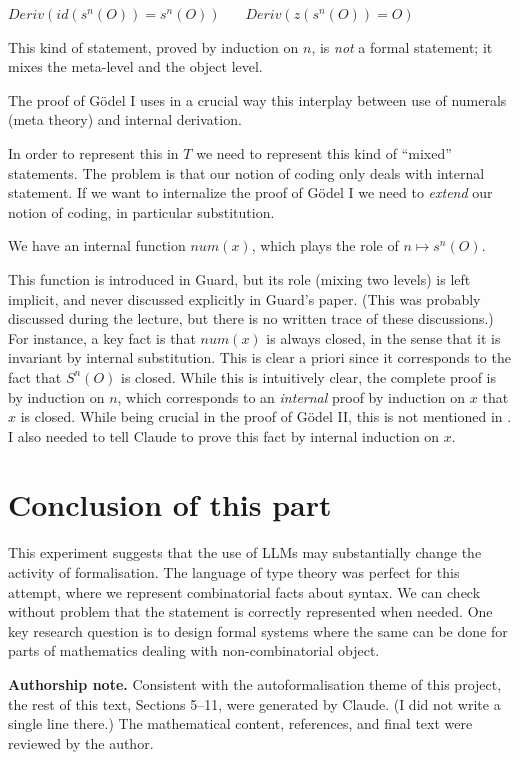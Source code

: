 \documentclass[11pt]{article}
\theoremstyle{plain}
\theoremstyle{definition}
\theoremstyle{remark}
\begin{document}
$Deriv(id(s^n(O)) = s^{n}(O))~~~~~~~~Deriv(z(s^n(O)) = O)$

This kind of statement, proved by induction on $n$, is {\em not}
a formal statement; it mixes the meta-level 
and the object level.

The proof of G\"odel I uses in a crucial way this interplay between
use of numerals (meta theory) and internal derivation. 

In order to represent this in $T$ we need to represent this kind of ``mixed'' statements.
The problem is that our notion of coding only deals with internal statement. If we want
to internalize the proof of G\"odel I we need to {\em extend} our notion of coding, in
particular substitution.

We have an internal function $num(x)$, which plays the role of $n\mapsto s^n(O)$.

This function is introduced in Guard, but its role (mixing two levels)
is left implicit, and never discussed explicitly in Guard's paper. (This was probably discussed
during the lecture, but there is no written trace of these discussions.)
For instance, a key fact is that $num(x)$ is always closed, in the sense that it is invariant by
internal substitution. This is clear a priori since it corresponds to the fact that $S^n(O)$ is closed.
While this is intuitively clear, the complete proof is by induction on $n$, which corresponds to
an {\em internal} proof by induction on $x$ that $x$ is closed. While being crucial in the proof
of G\"odel II, this is not mentioned in \cite{Guard63}. I also needed to tell Claude to prove this fact
by internal induction on $x$.

\medskip

\section*{Conclusion of this part}

This experiment suggests that the use of LLMs may substantially change the activity of formalisation.
The language of type theory
was perfect for this attempt, where we represent combinatorial facts about syntax. We can check without problem that the
statement is correctly represented when needed. One key research question is to design formal systems where the same can be
done for parts of mathematics dealing with non-combinatorial object.

{\bf Authorship note.}
Consistent with the autoformalisation theme of this project, the rest of this text, Sections 5–11, were generated by Claude.
(I did not write a single line there.)
The mathematical content, references, and final text were reviewed by the author.
\end{document}
